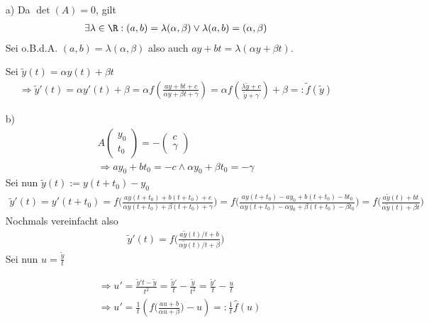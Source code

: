 \begin{solution}
\begin{itemize}
  \item[a)]
  Da $\det(A) = 0$, gilt
  \begin{align*}
    \exists \lambda \in \R: (a,b) = \lambda (\alpha, \beta) \lor \lambda (a,b) = (\alpha, \beta)
  \end{align*}
  Sei o.B.d.A. $(a,b) = \lambda (\alpha, \beta)$ also auch $ay + bt = \lambda (\alpha y + \beta t)$.

  Sei $\tilde{y}(t) = \alpha y(t) + \beta t$
  \begin{align*}
    \Rightarrow \tilde{y}'(t) = \alpha y'(t) + \beta = \alpha f\left(\frac{ay + bt + c}{\alpha y + \beta t + \gamma}\right) = \alpha
    f\left(\frac{\lambda \tilde{y} + c}{\tilde{y} + \gamma}\right) + \beta =: \tilde{f}(\tilde{y})
  \end{align*}

  \item[b)]
  \begin{align*}
    A\left(
    \begin{array}{c}
      y_0 \\
      t_0
    \end{array}
    \right) = -\left(
    \begin{array}{c}
      c \\
      \gamma
    \end{array}
    \right) \\
    \Rightarrow ay_0 + bt_0 = -c \land \alpha y_0 + \beta t_0 = -\gamma
  \end{align*}
  Sei nun $\tilde{y}(t) := y(t + t_0 ) - y_0$
  \begin{align*}
    \tilde{y}'(t) = y'(t + t_0 ) = f \bigg(\frac{ay(t+t_0) + b(t+t_0) + c}{\alpha y(t+t_0) + \beta (t+t_0) + \gamma}\bigg) = f\bigg(\frac{ay(t+t_0) - ay_0 + b(t+t_0) - bt_0}{\alpha y(t+t_0) -\alpha y_0 + \beta (t+t_0) - \beta t_0}
    \bigg) = f \bigg(\frac{a\tilde{y}(t) + bt}{\alpha \tilde{y}(t) + \beta t}\bigg)
  \end{align*}
  Nochmals vereinfacht also
  \begin{align*}
    \tilde{y}'(t) = f \bigg(\frac{a\tilde{y}(t)/t + b}{\alpha \tilde{y}(t)/t + \beta }\bigg)
  \end{align*}
  Sei nun $u = \frac{\tilde{y}}{t}$

  \begin{align*}
    &\Rightarrow u' = \frac{\tilde{y}' t - \tilde{y}}{t^{2}} = \frac{\tilde{y}'}{t} - \frac{\tilde{y}}{t^{2}} = \frac{\tilde{y}'}{t} - \frac{u}{t} \\
    &\Rightarrow u' = \frac{1}{t} \left(f \bigg(\frac{au + b}{\alpha u + \beta }\bigg) - u\right) =: \frac{1}{t} \hat{f}(u)
  \end{align*}
\end{itemize}
\end{solution}
